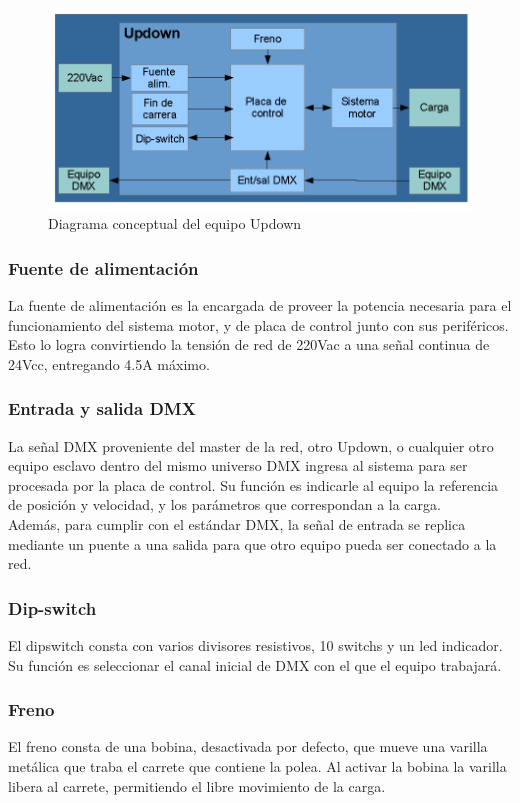 \begin{figure}[!ht]
	\centering
	\includegraphics[width=15cm,scale=1]{resources/1_10-diagramaBasicoUpdown.png}
	\caption{Diagrama conceptual del equipo Updown}
	\label{fig:\thefigure}
\end{figure}

\subsubsection{Fuente de alimentación}
La fuente de alimentación es la encargada de proveer la potencia necesaria para el funcionamiento del sistema motor, y de placa de control junto con sus periféricos. Esto lo logra convirtiendo la tensión de red de 220Vac a una señal continua de 24Vcc, entregando 4.5A máximo.

\subsubsection{Entrada y salida DMX}
La señal DMX proveniente del master de la red, otro Updown, o cualquier otro equipo esclavo dentro del mismo universo DMX ingresa al sistema para ser procesada por la placa de control. Su función es indicarle al equipo la referencia de posición y velocidad, y los parámetros que correspondan a la carga.\\
Además, para cumplir con el estándar DMX, la señal de entrada se replica mediante un puente a una salida para que otro equipo pueda ser conectado a la red.

\subsubsection{Dip-switch}
El dipswitch consta con varios divisores resistivos, 10 switchs y un led indicador. Su función es seleccionar el canal inicial de DMX con el que el equipo trabajará.

\subsubsection{Freno}
El freno consta de una bobina, desactivada por defecto, que mueve una varilla metálica que traba el carrete que contiene la polea. Al activar la bobina la varilla libera al carrete, permitiendo el libre movimiento de la carga.

